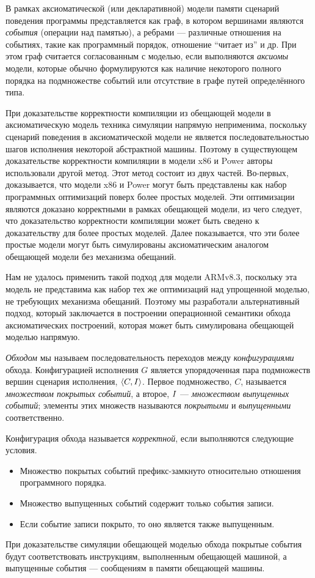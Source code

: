 В рамках аксиоматической (или декларативной) модели памяти сценарий поведения программы представляется как граф, в котором вершинами
являются \emph{события} (операции над памятью), а ребрами --- различные отношения на событиях, такие как программный
порядок, отношение ``читает из'' и др. При этом граф считается согласованным с моделью, если выполняются \emph{аксиомы} модели,
которые обычно формулируются как наличие некоторого полного порядка на подмножестве событий или отсутствие  в графе путей определённого
типа.

При доказательстве корректности компиляции из обещающей модели в аксиоматическую модель техника симуляции напрямую
неприменима, поскольку сценарий поведения в аксиоматической модели не является последовательностью шагов исполнения некоторой абстрактной машины.
Поэтому в существующем доказательстве корректности компиляции в 
модели x86 и Power авторы использовали другой метод. Этот метод состоит из двух частей.
Во-первых, доказывается, что модели x86 и Power могут быть представлены как набор программных оптимизаций поверх
более простых моделей. Эти оптимизации являются доказано корректными в рамках обещающей модели, из чего следует,
что доказательство корректности компиляции может быть сведено к доказательству для более простых моделей.
Далее показывается, что эти более простые модели могут быть симулированы аксиоматическим аналогом
обещающей модели без механизма обещаний.

Нам не удалось применить такой подход для модели ARMv8.3, поскольку эта модель не представима как набор тех же
оптимизаций над упрощенной моделью, не требующих механизма обещаний. Поэтому мы разработали альтернативный подход,
который заключается в построении операционной семантики обхода аксиоматических построений, которая может быть
симулирована обещающей моделью напрямую.

\emph{Обходом} мы называем последовательность переходов между \emph{конфигурациями} обхода. Конфигурацией исполнения $G$ является
упорядоченная пара подмножеств вершин сценария исполнения, ${\langle{C, I}\rangle}$.
Первое подмножество, $C$, называется \emph{множеством покрытых событий}, а второе, $I$ --- \emph{множеством выпущенных событий};
элементы этих множеств называются \emph{покрытыми} и \emph{выпущенными} соответственно.

Конфигурация обхода называется \emph{корректной}, если выполняются следующие условия.
\begin{itemize}
  \item Множество покрытых событий префикс-замкнуто относительно отношения программного порядка.
  \item Множество выпущенных событий содержит только события записи.
  \item Если событие записи покрыто, то оно является также выпущенным.
\end{itemize}
При доказательстве симуляции обещающей моделью обхода покрытые события будут соответствовать инструкциям, выполненным
обещающей машиной, а выпущенные события --- сообщениям в памяти обещающей машины.

